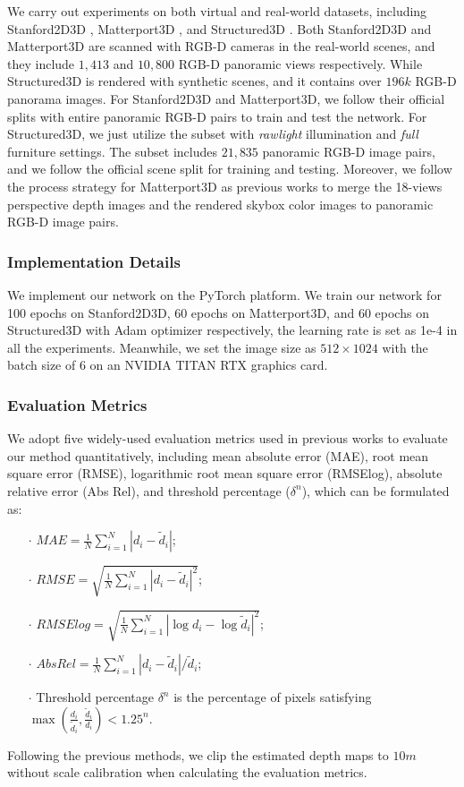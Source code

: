\documentclass[letterpaper]{article} \usepackage{aaai21}  \usepackage{times}  \usepackage{helvet} \usepackage{courier}  \usepackage[hyphens]{url}  \usepackage{graphicx} \urlstyle{rm} \def\UrlFont{\rm}  \usepackage{natbib}  \usepackage{caption} \frenchspacing  \setlength{\pdfpagewidth}{8.5in}  \setlength{\pdfpageheight}{11in}
\begin{document}
We carry out experiments on both virtual and real-world datasets, including Stanford2D3D \cite{DBLP:journals/corr/ArmeniSZS17}, Matterport3D \cite{DBLP:conf/3dim/ChangDFHNSSZZ17}, and Structured3D \cite{DBLP:conf/eccv/ZhengZLTGZ20}. Both Stanford2D3D and Matterport3D are scanned with RGB-D cameras in the real-world scenes, and they include $1,413$ and $10,800$ RGB-D panoramic views respectively. While Structured3D is rendered with synthetic scenes, and it contains over $196k$ RGB-D panorama images. 
For Stanford2D3D and Matterport3D, we follow their official splits with entire panoramic RGB-D pairs to train and test the network. For Structured3D, we just utilize the subset with \textit{rawlight} illumination and \textit{full} furniture settings. The subset includes $21,835$ panoramic RGB-D image pairs, and we follow the official scene split for training and testing. 
Moreover, we follow the process strategy for Matterport3D as previous works to merge the 18-views perspective depth images and the rendered skybox color images to panoramic RGB-D image pairs.

\subsubsection{Implementation Details}
We implement our network on the PyTorch \cite{DBLP:conf/nips/PaszkeGMLBCKLGA19} platform. We train our network for 100 epochs on Stanford2D3D, 60 epochs on Matterport3D, and 60 epochs on Structured3D with Adam \cite{DBLP:journals/corr/KingmaB14} optimizer respectively, the learning rate is set as 1e-4 in all the experiments. 
Meanwhile, we set the image size as $512\times1024$ with the batch size of 6 on an NVIDIA TITAN RTX graphics card.

\subsubsection{Evaluation Metrics}
We adopt five widely-used evaluation metrics used in previous works to evaluate our method quantitatively, including mean absolute error (MAE), root mean square error (RMSE), logarithmic root mean square error (RMSElog), absolute relative error (Abs Rel), and threshold percentage ($\delta^n$), which can be formulated as:
\begin{itemize}
    \item[\textbf{$\cdot$}] $ MAE=\frac{1}{N}\sum_{i=1}^N |d_i-\widetilde{d}_i| $;
    \item[\textbf{$\cdot$}] $ RMSE=\sqrt{\frac{1}{N}\sum_{i=1}^N |d_i-\widetilde{d}_i|^2} $;
    \item[\textbf{$\cdot$}] $ RMSElog=\sqrt{\frac{1}{N}\sum_{i=1}^N |\log d_i - \log \widetilde{d}_i|^2}$;
    \item[\textbf{$\cdot$}] $ Abs Rel=\frac{1}{N}\sum_{i=1}^N |d_i-\widetilde{d}_i|/\widetilde{d}_i$;
    \item[\textbf{$\cdot$}] Threshold percentage $\delta^n$ is the percentage of pixels satisfying $\max(\frac{d_i}{\widetilde{d}_i},\frac{\widetilde{d}_i}{d_i})<1.25^n$.
\end{itemize}
Following the previous methods, we clip the estimated depth maps to $10m$ without scale calibration when calculating the evaluation metrics.
\end{document}
